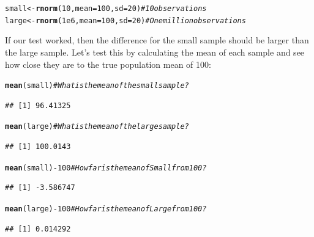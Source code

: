 \documentclass{tufte-book}\usepackage[]{graphicx}\usepackage[]{color}
\makeatletter
\newcommand{\hlnum}[1]{\textcolor[rgb]{0.686,0.059,0.569}{#1}}%
\newcommand{\hlcom}[1]{\textcolor[rgb]{0.678,0.584,0.686}{\textit{#1}}}%
\newcommand{\hlopt}[1]{\textcolor[rgb]{0,0,0}{#1}}%
\newcommand{\hlstd}[1]{\textcolor[rgb]{0.345,0.345,0.345}{#1}}%
\newcommand{\hlkwb}[1]{\textcolor[rgb]{0.69,0.353,0.396}{#1}}%
\newcommand{\hlkwc}[1]{\textcolor[rgb]{0.333,0.667,0.333}{#1}}%
\newcommand{\hlkwd}[1]{\textcolor[rgb]{0.737,0.353,0.396}{\textbf{#1}}}%
\newenvironment{kframe}{%
 \def\at@end@of@kframe{}%
 \ifinner\ifhmode%
  \def\at@end@of@kframe{\end{minipage}}%
  \begin{minipage}{\columnwidth}%
 \fi\fi%
 \def\FrameCommand##1{\hskip\@totalleftmargin \hskip-\fboxsep
 \colorbox{shadecolor}{##1}\hskip-\fboxsep
     \hskip-\linewidth \hskip-\@totalleftmargin \hskip\columnwidth}%
 \MakeFramed {\advance\hsize-\width
   \@totalleftmargin\z@ \linewidth\hsize
   \@setminipage}}%
 {\par\unskip\endMakeFramed%
 \at@end@of@kframe}
\newenvironment{knitrout}{}{} %
\makeatother
\begin{document}
\begin{footnotesize}
\begin{knitrout}
\color{fgcolor}\begin{kframe}
\begin{alltt}
\hlstd{small} \hlkwb{<-} \hlkwd{rnorm}\hlstd{(}\hlnum{10}\hlstd{,} \hlkwc{mean} \hlstd{=} \hlnum{100}\hlstd{,} \hlkwc{sd} \hlstd{=} \hlnum{20}\hlstd{)} \hlcom{# 10 observations}
\hlstd{large} \hlkwb{<-} \hlkwd{rnorm}\hlstd{(}\hlnum{1e6}\hlstd{,} \hlkwc{mean} \hlstd{=} \hlnum{100}\hlstd{,} \hlkwc{sd} \hlstd{=} \hlnum{20}\hlstd{)} \hlcom{# One million observations}
\end{alltt}
\end{kframe}
\end{knitrout}
\end{footnotesize}

If our test worked, then the difference for the small sample should be larger than the large sample. Let's test this by calculating the mean of each sample and see how close they are to the true population mean of 100:

\begin{footnotesize}
\begin{knitrout}
\color{fgcolor}\begin{kframe}
\begin{alltt}
\hlkwd{mean}\hlstd{(small)} \hlcom{# What is the mean of the small sample?}
\end{alltt}
\begin{verbatim}
## [1] 96.41325
\end{verbatim}
\begin{alltt}
\hlkwd{mean}\hlstd{(large)} \hlcom{# What is the mean of the large sample?}
\end{alltt}
\begin{verbatim}
## [1] 100.0143
\end{verbatim}
\begin{alltt}
\hlkwd{mean}\hlstd{(small)} \hlopt{-} \hlnum{100} \hlcom{# How far is the mean of Small from 100?}
\end{alltt}
\begin{verbatim}
## [1] -3.586747
\end{verbatim}
\begin{alltt}
\hlkwd{mean}\hlstd{(large)} \hlopt{-} \hlnum{100} \hlcom{# How far is the mean of Large from 100?}
\end{alltt}
\begin{verbatim}
## [1] 0.014292
\end{verbatim}
\end{kframe}
\end{knitrout}
\end{footnotesize}
\end{document}
